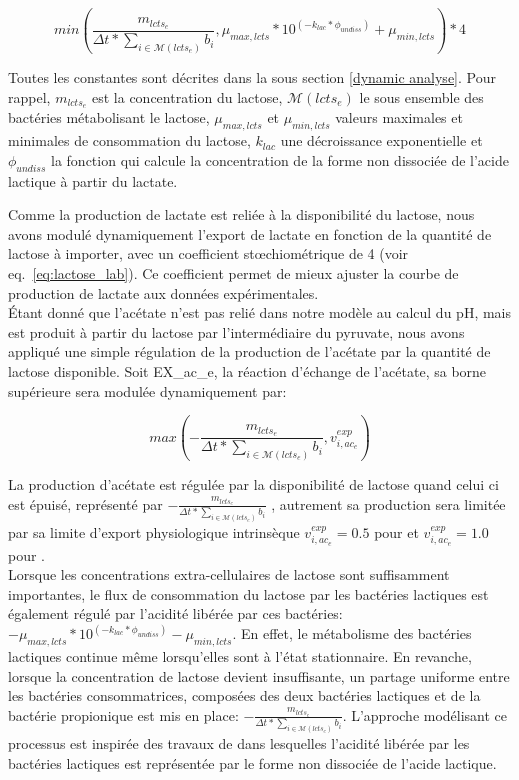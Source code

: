 \begin{equation}
min(\frac{m_{lcts_e}}{\Delta t*\sum_{i \in \mathcal{M}(lcts_e)} b_i},\mu_{max,lcts}*10^{(-k_{lac}*\phi_{undiss})}+\mu_{min,lcts})*4
\label{eq:lactate_lactis}
\end{equation}

Toutes les constantes sont décrites dans la sous section \ref{dynamic analyse}. Pour rappel, $m_{lcts_e}$ est la concentration du lactose, $\mathcal{M}(lcts_e)$ le sous ensemble des bactéries métabolisant le lactose, $\mu_{max,lcts}$ et $\mu_{min,lcts}$ valeurs maximales et minimales de consommation du lactose, $k_{lac}$ une décroissance exponentielle et $\phi_{undiss}$ la fonction qui calcule la concentration de la forme non dissociée de l'acide lactique à partir du lactate.

Comme la production de lactate est reliée à la disponibilité du lactose, nous avons modulé dynamiquement l'export de lactate en fonction de la quantité de lactose à importer, avec un coefficient st\oe{}chiométrique de 4 (voir eq.~\eqref{eq:lactose_lab}). Ce coefficient permet de mieux ajuster la courbe de production de lactate aux données expérimentales.\\

Étant donné que l'acétate n'est pas relié dans notre modèle au calcul du pH, mais est produit à partir du lactose par l'intermédiaire du pyruvate, nous avons appliqué une simple régulation de la production de l'acétate par la quantité de lactose disponible. Soit EX\_ac\_e, la réaction d'échange de l'acétate, sa borne supérieure sera modulée dynamiquement par:

\begin{equation*}
max(-\frac{m_{lcts_e}}{\Delta t*\sum_{i \in \mathcal{M}(lcts_e)} b_i},v^{exp}_{i,ac_e})
\end{equation*}

La production d'acétate est régulée par la disponibilité de lactose quand celui ci est épuisé, représenté par $-\frac{m_{lcts_e}}{\Delta t*\sum_{i \in \mathcal{M}(lcts_e)} b_i}$ , autrement sa production sera limitée par sa limite d'export physiologique intrinsèque $v^{exp}_{i,ac_e}=0.5$ pour \lactis et $v^{exp}_{i,ac_e}=1.0$ pour \plantarum. \\

Lorsque les concentrations extra-cellulaires de lactose sont suffisamment importantes, le flux de consommation du lactose par les bactéries lactiques est également régulé par l'acidité libérée par ces bactéries: $-\mu_{max,lcts}*10^{(-k_{lac}*\phi_{undiss})}-\mu_{min,lcts}$. En effet, le métabolisme des bactéries lactiques continue même lorsqu'elles sont à l'état stationnaire. En revanche, lorsque la concentration de lactose devient insuffisante, un partage uniforme entre les bactéries consommatrices, composées des deux bactéries lactiques et de la bactérie propionique est mis en place: $-\frac{m_{lcts_e}}{\Delta t*\sum_{i \in \mathcal{M}(lcts_e)} b_i}$. L'approche modélisant ce processus est inspirée des travaux de \citep{Ozcan.2020} dans lesquelles l'acidité libérée par les bactéries lactiques est représentée par le forme non dissociée de l'acide lactique.\\

